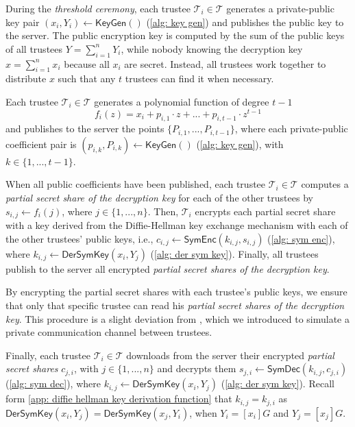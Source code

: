 During the \textit{threshold ceremony}, each trustee $\mathcal{T}_i \in \boldsymbol{\mathcal{T}}$ generates a private-public key pair $(x_i, Y_i) \gets \mathsf{KeyGen}()$ (\cref{alg: key gen}) and publishes the public key to the server. The public encryption key is computed by the sum of the public keys of all trustees $Y = \sum_{i=1}^n Y_i$, while nobody knowing the decryption key $x = \sum_{i=1}^n x_i$ because all $x_i$ are secret. Instead, all trustees work together to distribute $x$ such that any $t$ trustees can find it when necessary. 

Each trustee $\mathcal{T}_i \in \boldsymbol{\mathcal{T}}$ generates a polynomial function of degree $t-1$
\[
f_i(z) = x_i + p_{i, 1} \cdot z + ... + p_{i, t-1} \cdot z^{t-1}
\]
and publishes to the server the points $\{ P_{i, 1}, ..., P_{i, t-1} \}$, where each private-public coefficient pair is $(p_{i, k}, P_{i, k}) \gets \mathsf{KeyGen}()$ (\cref{alg: key gen}), with $k \in \{ 1, ..., t-1 \}$.

When all public coefficients have been published, each trustee $\mathcal{T}_i \in \boldsymbol{\mathcal{T}}$ computes a \textit{partial secret share of the decryption key} for each of the other trustees by $s_{i, j} \gets f_i(j)$, where $j \in \{ 1, ..., n \}$. Then, $\mathcal{T}_i$ encrypts each partial secret share with a key derived from the Diffie-Hellman key exchange mechanism with each of the other trustees' public keys, i.e., $c_{i, j} \gets \mathsf{SymEnc}(k_{i, j}, s_{i, j})$ (\cref{alg: sym enc}), where $k_{i, j} \gets \mathsf{DerSymKey} (x_i, Y_j)$ (\cref{alg: der sym key}). Finally, all trustees publish to the server all encrypted \textit{partial secret shares of the decryption key}.

By encrypting the partial secret shares with each trustee's public keys, we ensure that only that specific trustee can read his \textit{partial secret shares of the decryption key}. This procedure is a slight deviation from \cite{Pedersen91}, which we introduced to simulate a private communication channel between trustees.

Finally, each trustee $\mathcal{T}_i \in \boldsymbol{\mathcal{T}}$ downloads from the server their encrypted \textit{partial secret shares} $c_{j, i}$, with $j \in \{ 1, ..., n \}$ and decrypts them $s_{j, i} \gets \mathsf{SymDec}(k_{i, j}, c_{j, i})$ (\cref{alg: sym dec}), where $k_{i, j} \gets \mathsf{DerSymKey} (x_i, Y_j)$ (\cref{alg: der sym key}). Recall form \cref{app: diffie hellman key derivation function} that $k_{i, j} = k_{j, i}$ as $\mathsf{DerSymKey} (x_i, Y_j) = \mathsf{DerSymKey} (x_j, Y_i)$, when $Y_i = [x_i]G$ and $Y_j = [x_j]G$.

